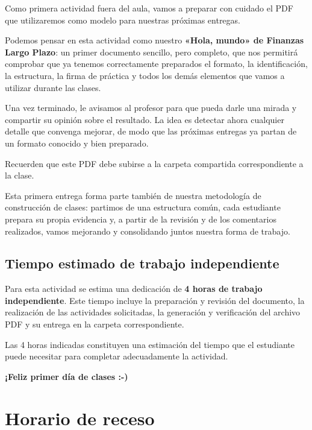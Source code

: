 \documentclass[10pt]{article}
\begin{document}
Como primera actividad fuera del aula, vamos a preparar con cuidado el PDF que utilizaremos como modelo para nuestras próximas entregas.

Podemos pensar en esta actividad como nuestro \textbf{«Hola, mundo» de Finanzas Largo Plazo}: un primer documento sencillo, pero completo, que nos permitirá comprobar que ya tenemos correctamente preparados el formato, la identificación, la estructura, la firma de práctica y todos los demás elementos que vamos a utilizar durante las clases.

Una vez terminado, le avisamos al profesor para que pueda darle una mirada y compartir su opinión sobre el resultado. La idea es detectar ahora cualquier detalle que convenga mejorar, de modo que las próximas entregas ya partan de un formato conocido y bien preparado.

Recuerden que este PDF debe subirse a la carpeta compartida correspondiente a la clase.

Esta primera entrega forma parte también de nuestra metodología de construcción de clases: partimos de una estructura común, cada estudiante prepara su propia evidencia y, a partir de la revisión y de los comentarios realizados, vamos mejorando y consolidando juntos nuestra forma de trabajo.

\subsection{Tiempo estimado de trabajo independiente}

Para esta actividad se estima una dedicación de
\textbf{4 horas de trabajo independiente}. Este tiempo incluye la
preparación y revisión del documento, la realización de las actividades
solicitadas, la generación y verificación del archivo PDF y su entrega
en la carpeta correspondiente.

Las 4 horas indicadas constituyen una estimación del tiempo que el
estudiante puede necesitar para completar adecuadamente la actividad.



\begin{center}
\textbf{¡Feliz primer día de clases :-)}
\end{center}

\appendix

\section{Horario de receso}
\end{document}
